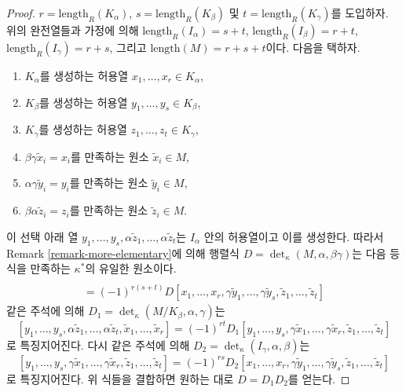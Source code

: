\begin{proof}
\medskip\noindent
$r = \text{length}_R(K_\alpha)$,
$s = \text{length}_R(K_\beta)$ 및 $t = \text{length}_R(K_\gamma)$를
도입하자. 위의 완전열들과 가정에 의해
$\text{length}_R(I_\alpha) = s + t$, $\text{length}_R(I_\beta) = r + t$,
$\text{length}_R(I_\gamma) = r + s$, 그리고
$\text{length}(M) = r + s + t$이다. 다음을 택하자.
\begin{enumerate}
\item $K_\alpha$를 생성하는 허용열 $x_1, \ldots, x_r \in K_\alpha$,
\item $K_\beta$를 생성하는 허용열 $y_1, \ldots, y_s \in K_\beta$,
\item $K_\gamma$를 생성하는 허용열 $z_1, \ldots, z_t \in K_\gamma$,
\item $\beta\gamma\tilde x_i = x_i$를 만족하는 원소 $\tilde x_i \in M$,
\item $\alpha\gamma\tilde y_i = y_i$를 만족하는 원소 $\tilde y_i \in M$,
\item $\beta\alpha\tilde z_i = z_i$를 만족하는 원소 $\tilde z_i \in M$.
\end{enumerate}
이 선택 아래 열
$y_1, \ldots, y_s, \alpha\tilde z_1, \ldots, \alpha\tilde z_t$는
$I_\alpha$ 안의 허용열이고 이를 생성한다. 따라서 Remark
\ref{remark-more-elementary}에 의해 행렬식
$D = \det_\kappa(M, \alpha, \beta\gamma)$는 다음 등식을 만족하는
$\kappa^*$의 유일한 원소이다.
\begin{align*}
[y_1, \ldots, y_s,
\alpha\tilde z_1, \ldots, \alpha\tilde z_s,
\tilde x_1, \ldots, \tilde x_r] \\
= (-1)^{r(s + t)} D
[x_1, \ldots, x_r,
\gamma\tilde y_1, \ldots, \gamma\tilde y_s,
\tilde z_1, \ldots, \tilde z_t]
\end{align*}
같은 주석에 의해 $D_1 = \det_\kappa(M/K_\beta, \alpha, \gamma)$는
$$
[y_1, \ldots, y_s,
\alpha\tilde z_1, \ldots, \alpha\tilde z_t,
\tilde x_1, \ldots, \tilde x_r]
=
(-1)^{rt} D_1
[y_1, \ldots, y_s,
\gamma\tilde x_1, \ldots, \gamma\tilde x_r,
\tilde z_1, \ldots, \tilde z_t]
$$
로 특징지어진다. 다시 같은 주석에 의해
$D_2 = \det_\kappa(I_\gamma, \alpha, \beta)$는
$$
[y_1, \ldots, y_s,
\gamma\tilde x_1, \ldots, \gamma\tilde x_r,
\tilde z_1, \ldots, \tilde z_t]
=
(-1)^{rs} D_2
[x_1, \ldots, x_r,
\gamma\tilde y_1, \ldots, \gamma\tilde y_s,
\tilde z_1, \ldots, \tilde z_t]
$$
로 특징지어진다. 위 식들을 결합하면 원하는 대로 $D = D_1 D_2$를
얻는다.
\end{proof}



